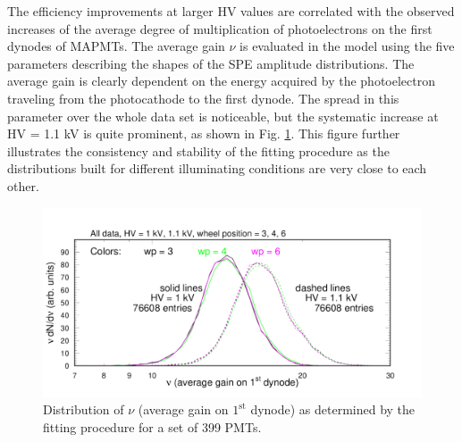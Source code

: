 The efficiency improvements at larger HV values are correlated with the observed increases of the average degree of multiplication of photoelectrons on the first dynodes of MAPMTs. The average gain $\nu$ is evaluated in the model using the five parameters describing the shapes of the SPE amplitude distributions. The average gain is clearly dependent on the energy acquired by the photoelectron traveling from the photocathode to the first dynode. The spread in this parameter over the whole data set is noticeable, but the systematic increase at HV = 1.1 kV is quite prominent, as shown in Fig. \ref{fig:pglobal_nu}. This figure further illustrates the consistency and stability of the fitting procedure as the distributions built for different illuminating conditions are very close to each other.
\begin{figure}[hbt]
	\centering
	\includegraphics[width=0.98\linewidth, trim=0 15 50 35,clip]{figures/pglobal_nu.pdf}
	\caption{Distribution of $\nu$ (average gain on $1^{\mathrm{st}}$ dynode) as determined by the fitting procedure for a set of 399 PMTs.}
	\label{fig:pglobal_nu}
\end{figure}


